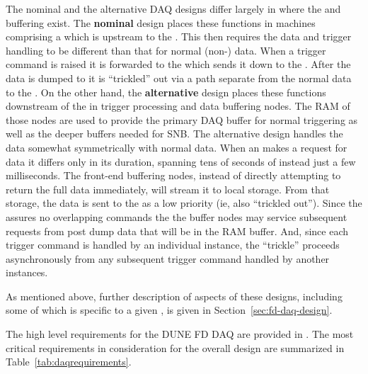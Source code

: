 The nominal and the alternative DAQ designs differ largely in where
the  and  buffering exist. 
The \textbf{nominal} design places these functions in machines
comprising a  which is upstream to the . 
This then requires the  data and trigger handling to be
different than that for normal (non-) data. 
When a  trigger command is raised it is forwarded to the
 which sends it down to the . 
After the  data is dumped to  it is
``trickled'' out via a path separate from the normal data to the
. 
On the other hand, the \textbf{alternative} design places these
functions downstream of the  in trigger processing and data
buffering nodes.
The RAM of those nodes are used to provide the primary DAQ buffer for
normal triggering as well as the deeper buffers needed for SNB. 
The alternative design handles the  data somewhat
symmetrically with normal data. 
When an  makes a request for  data it differs
only in its duration, spanning tens of seconds of instead just a few
milliseconds. 
The front-end buffering nodes, instead of directly attempting to
return the full  data immediately, will stream it to local
 storage. 
From that storage, the data is sent to the  as a low
priority (ie, also ``trickled out'').
Since the  assures no overlapping commands the the buffer
nodes may service subsequent requests from post dump data that will be
in the RAM buffer.
And, since each trigger command is handled by an individual 
instance, the ``trickle'' proceeds asynchronously from any subsequent
trigger command handled by another  instances.

As mentioned above, further description of aspects of these designs,
including some of which is specific to a given , is
given in Section~\ref{sec:fd-daq-design}.


The high level requirements for the DUNE FD DAQ are provided in
\cite{daq:reqs}.
The most critical requirements in consideration for the overall design
are summarized in Table~\ref{tab:daqrequirements}.

